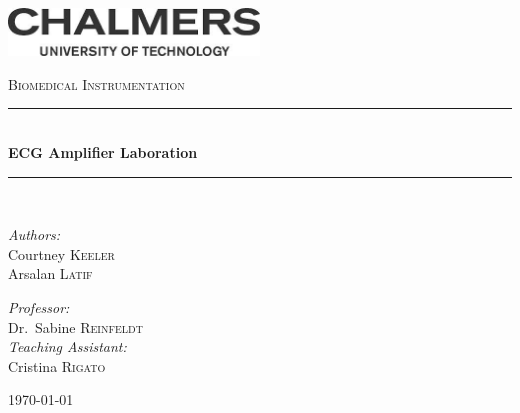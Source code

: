 \documentclass[pdftex,12pt,letterpaper]{article}
\newcommand{\HRule}{\rule{\linewidth}{0.5mm}}
\begin{document}

\begin{titlepage}
\begin{center}

\includegraphics[width=0.5\textwidth]{./logo}~\\[1cm]

\vspace{4cm}

\textsc{\Large Biomedical Instrumentation}\\[0.5cm]

\HRule \\[0.4cm]
{ \huge \bfseries ECG Amplifier Laboration \\[0.4cm] }

\HRule \\[1.5cm]

\noindent
\begin{minipage}{0.4\textwidth}
\begin{flushleft} \large
\emph{Authors:}\\
Courtney \textsc{Keeler} \\
Arsalan \textsc{Latif}
\end{flushleft}
\end{minipage}%
\begin{minipage}{0.4\textwidth}
\begin{flushright} \large
\emph{Professor:} \\
Dr.~Sabine \textsc{Reinfeldt} \\
\emph{Teaching Assistant:} \\
Cristina \textsc{Rigato}
\end{flushright}
\end{minipage}

\vfill

{\large \today}

\end{center}
\end{titlepage}
\end{document}
